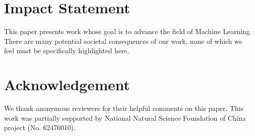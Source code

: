 \documentclass{llmxive}
\begin{document}
\section*{Impact Statement}
This paper presents work whose goal is to advance the field of Machine Learning. There are many potential societal consequences of our work, none of which we feel must be specifically highlighted here.

\section*{Acknowledgement}
We thank anonymous reviewers for their helpful comments on this paper. This work was partially supported by National Natural Science Foundation of China project (No. 62476010).  









\appendix
\end{document}
